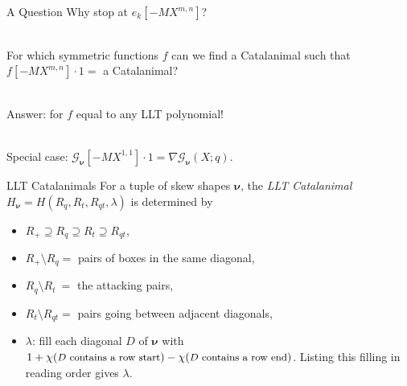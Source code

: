 \documentclass[dvipsnames,handout]{beamer}
\newcommand{\Gcal}{{\mathcal G}}
\newcommand{\nubold}{{\boldsymbol \nu }}
\theoremstyle{definition}
\newcounter{c}
\begin{document}
\begin{frame}{A Question}
  Why stop at \(e_k[-MX^{m,n}]\)? \pause

  \ \\
  
  For which symmetric functions \(f\) can we find a Catalanimal such
  that \(f[-MX^{m,n}] \cdot 1 = \) a Catalanimal? \pause

  \ \\

  Answer: for \(f\) equal to any LLT polynomial! \pause

  \ \\
  Special case: \(\Gcal_\nubold[-MX^{1,1}] \cdot 1 = \nabla
  \Gcal_\nubold(X;q)\).
\end{frame}
\begin{frame}{LLT Catalanimals}
  For a tuple of skew shapes $\nubold$, the \emph{LLT Catalanimal} $H_{\nubold} = H(R_q,R_t, R_{qt}, \lambda)$
is determined by
\vspace{1mm}
\begin{itemize}
\item $R_+ \supseteq R_q \supseteq R_t \supseteq R_{qt}$,\pause
\item $R_+ \setminus R_q = $ pairs of boxes in the same diagonal,
\item $R_q \setminus R_t \ = $ the attacking pairs,
\item  $R_t \setminus R_{qt}  = $ pairs going between adjacent diagonals,\pause
\item $\lambda$: fill each diagonal $D$ of $\nubold$ with
$1+\chi({\small \text{$D$ contains a row start}}) - \chi({\small \text{$D$ contains a row end}})$. \break
Listing this filling in reading order gives  $\lambda$.
\end{itemize}
\end{frame}
\end{document}
